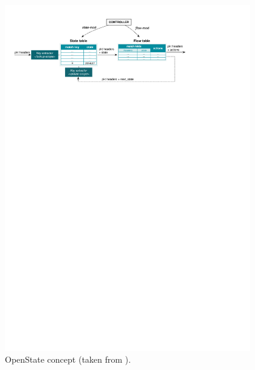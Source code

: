 \begin{figure}[ht]
    \centering
    \includegraphics[width=0.95\textwidth]{chapters/pic/OpenStateConcept}
    \caption{OpenState concept (taken from \protect\cite{OpenStateSpec}).}
    \label{fig:OpenStateConcept}
\end{figure}

